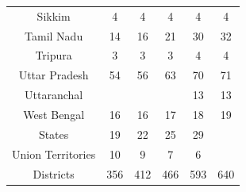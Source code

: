 \documentclass[12pt, a4paper]{article}
\begin{document}
\begin{table}[h!]
\begin{tabular}{c|ccccc}
		Sikkim & 4 & 4 & 4 & 4 & 4 \\ 
		Tamil Nadu & 14 & 16 & 21 & 30 & 32 \\ 
		Tripura & 3 & 3 & 3 & 4 & 4 \\ 
		Uttar Pradesh & 54 & 56 & 63 & 70 & 71 \\ 
		Uttaranchal &  &  &  & 13 & 13 \\ 
		West Bengal & 16 & 16 & 17 & 18 & 19 \\ 
		\hline
		States & 19 & 22 & 25 & 29 &  \\ 
		Union Territories & 10 & 9 & 7 & 6 &  \\ 
		Districts & 356 & 412 & 466 & 593 & 640 \\ 
		\hline
	\end{tabular}
\end{table}
\end{document}
